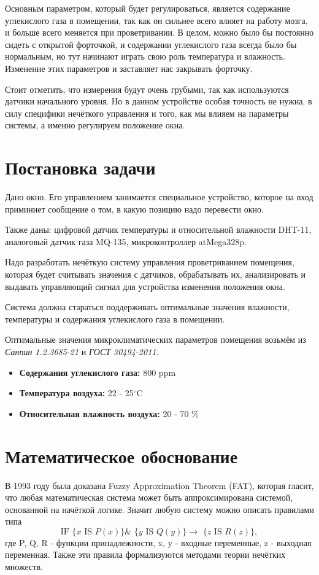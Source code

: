 \documentclass[a4paper]{article}
\begin{document}
Основным параметром, который будет регулироваться, является содержание
углекислого газа в помещении, так как он сильнее всего влияет на работу
мозга, и больше всего меняется при проветривании. В целом, можно было бы
постоянно сидеть с открытой форточкой, и содержании углекислого газа всегда
было бы нормальным, но тут начинают играть свою роль температура и
влажность. Изменение этих параметров и заставляет нас закрывать форточку.

Стоит отметить, что измерения будут очень грубыми, так как используются
датчики начального уровня. Но в данном устройстве особая точность не нужна,
в силу специфики нечёткого управления и того, как мы влияем на параметры
системы, а именно регулируем положение окна.

\newpage
\section{Постановка задачи}
Дано окно. Его управлением занимается специальное устройство,  
которое на вход приминиет сообщение о том, в какую позицию надо перевести
окно.

Также даны: цифровой датчик температуры и относительной влажности DHT-11, 
аналоговый датчик газа MQ-135, микроконтроллер atMega328p.

Надо разработать нечёткую систему управления проветриванием помещения,
которая будет считывать значения с датчиков, обрабатывать их, анализировать
и выдавать управляющий сигнал для устройства изменения положения окна.

Система должна стараться поддерживать оптимальные значения влажности,
температуры и содержания углекислого газа в помещении.

Оптимальные значения микроклиматических параметров помещения возьмём из 
{\itshape Санпин 1.2.3685-21} и {\itshape ГОСТ 30494-2011}.

\begin{itemize}
    \item {\bfseries Содержания углекислого газа:} 800 ppm
    \item {\bfseries Температура воздуха:} 22 - 25$^{\circ}$C
    \item {\bfseries Относительная влажность воздуха:} 20 - 70 \%
\end{itemize}

\section{Математическое обоснование}
В 1993 году была доказана Fuzzy Approximation Theorem (FAT), которая
гласит, что любая математическая система может быть аппроксимирована
системой, основанной на начёткой логике. Значит любую систему можно
описать правилами типа 
$$\text{IF \{}x \text{ IS } P(x) \text{\} }\& 
\text{ \{}y \text{ IS } Q(y) \text{\} } 
\rightarrow \text{ \{}z \text{ IS } R(z) \text{\}},$$
где P, Q, R - функции принадлежности, x, y - входные переменные,
z - выходная переменная. Также эти правила формализуются методами 
теории нечётких множеств.
\end{document}
